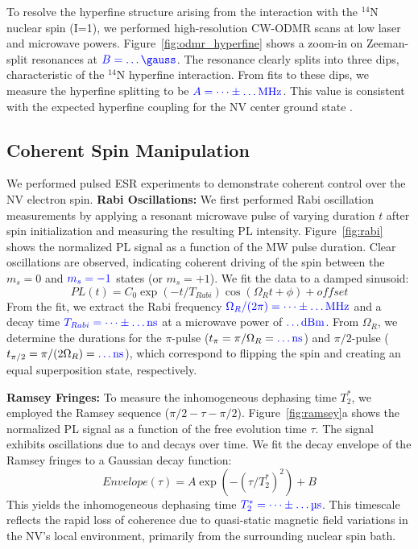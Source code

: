 \documentclass[aps,prb,twocolumn,superscriptaddress,floatfix,longbibliography,citeautoscript]{revtex4-2}
\begin{document}
To resolve the hyperfine structure arising from the interaction with the $^{14}$N nuclear spin (I=1), we performed high-resolution CW-ODMR scans at low laser and microwave powers.
Figure~\ref{fig:odmr_hyperfine} shows a zoom-in on  Zeeman-split resonances at $\blue{B = \dots \si{\gauss}}$.
The resonance clearly splits into three dips, characteristic of the $^{14}$N hyperfine interaction.
From fits to these dips, we measure the hyperfine splitting to be $\blue{A = \dots \pm \dots \si{\MHz}}$.
This value is consistent with the expected hyperfine coupling for the NV center ground state \cite{He1993PRB}. %

\subsection{\label{sec:results_coherent}Coherent Spin Manipulation}
We performed pulsed ESR experiments to demonstrate coherent control over the NV electron spin.
\textbf{Rabi Oscillations:} We first performed Rabi oscillation measurements by applying a resonant microwave pulse of varying duration $t$ after spin initialization and measuring the resulting PL intensity.
Figure~\ref{fig:rabi} shows the normalized PL signal as a function of the MW pulse duration.
Clear oscillations are observed, indicating coherent driving of the spin between the $m_s=0$ and $\blue{m_s=-1}$ states (or $m_s=+1$).
We fit the data to a damped sinusoid:
\begin{equation}
    PL(t) = C_0 \exp(-t/T_{Rabi}) \cos(\Omega_R t + \phi) + offset %
    \label{eq:rabi_fit}
\end{equation}
From the fit, we extract the Rabi frequency $\blue{\Omega_R / (2\pi) = \dots \pm \dots \si{\MHz}}$ and a decay time $\blue{T_{Rabi} = \dots \pm \dots \si{\nano\second}}$ at a microwave power of $\blue{\dots \si{dBm}}$.
From $\Omega_R$, we determine the durations for the $\pi$-pulse ($t_\pi = \pi / \Omega_R = \blue{\dots \si{\nano\second}}$) and $\pi/2$-pulse ($t_{\pi/2} = \pi / (2\Omega_R) = \blue{\dots \si{\nano\second}}$), which correspond to flipping the spin and creating an equal superposition state, respectively.

\textbf{Ramsey Fringes:} To measure the inhomogeneous dephasing time $T_2^*$, we employed the Ramsey sequence ($\pi/2 - \tau - \pi/2$).
Figure~\ref{fig:ramsey}a shows the normalized PL signal as a function of the free evolution time $\tau$.
The signal exhibits oscillations due to  and decays over time.
We fit the decay envelope of the Ramsey fringes to a Gaussian decay function:
\begin{equation}
    Envelope(\tau) = A \exp(-(\tau/T_2^*)^2) + B
    \label{eq:ramsey_fit}
\end{equation}
This yields the inhomogeneous dephasing time $\blue{T_2^* = \dots \pm \dots \si{\micro\second}}$.
This timescale reflects the rapid loss of coherence due to quasi-static magnetic field variations in the NV's local environment, primarily from the surrounding nuclear spin bath.
\end{document}
